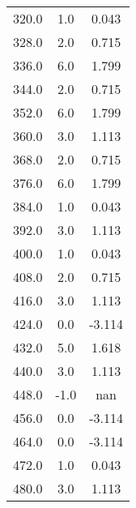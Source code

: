 \begin{table}
\begin{tabular}{ccc}
320.0 & 1.0 & 0.043 \\
328.0 & 2.0 & 0.715 \\
336.0 & 6.0 & 1.799 \\
344.0 & 2.0 & 0.715 \\
352.0 & 6.0 & 1.799 \\
360.0 & 3.0 & 1.113 \\
368.0 & 2.0 & 0.715 \\
376.0 & 6.0 & 1.799 \\
384.0 & 1.0 & 0.043 \\
392.0 & 3.0 & 1.113 \\
400.0 & 1.0 & 0.043 \\
408.0 & 2.0 & 0.715 \\
416.0 & 3.0 & 1.113 \\
424.0 & 0.0 & -3.114 \\
432.0 & 5.0 & 1.618 \\
440.0 & 3.0 & 1.113 \\
448.0 & -1.0 & nan \\
456.0 & 0.0 & -3.114 \\
464.0 & 0.0 & -3.114 \\
472.0 & 1.0 & 0.043 \\
480.0 & 3.0 & 1.113 \\
\end{tabular}
\end{table}

